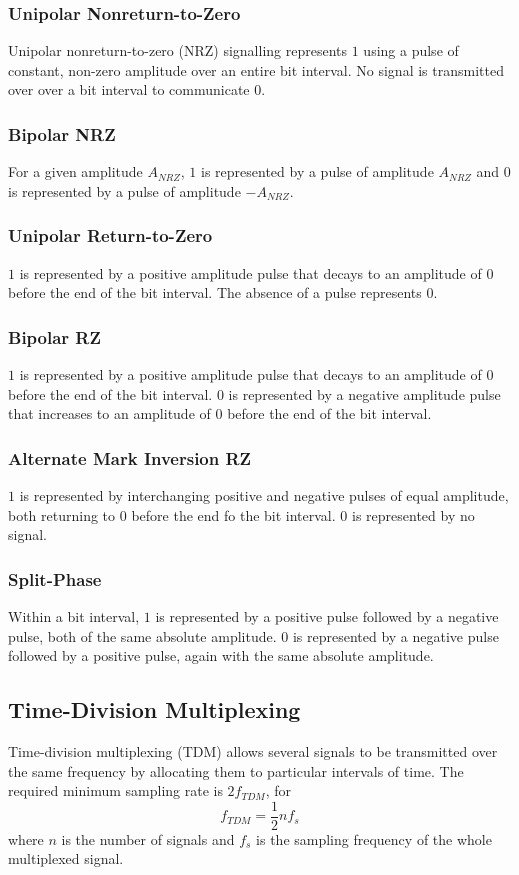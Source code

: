 \documentclass[]{article}
\begin{document}
\subsubsection{Unipolar Nonreturn-to-Zero}
Unipolar nonreturn-to-zero (NRZ) signalling represents $1$ using a pulse of constant, non-zero amplitude over an entire bit interval. No signal is transmitted over over a bit interval to communicate $0$.
\subsubsection{Bipolar NRZ}
For a given amplitude $A_{NRZ}$, $1$ is represented by a pulse of amplitude $A_{NRZ}$ and $0$ is represented by a pulse of amplitude $-A_{NRZ}$.
\subsubsection{Unipolar Return-to-Zero}
$1$ is represented by a positive amplitude pulse that decays to an amplitude of $0$ before the end of the bit interval. The absence of a pulse represents $0$.
\subsubsection{Bipolar RZ}
$1$ is represented by a positive amplitude pulse that decays to an amplitude of $0$ before the end of the bit interval. $0$ is represented by a negative amplitude pulse that increases to an amplitude of $0$ before the end of the bit interval.
\subsubsection{Alternate Mark Inversion RZ}
$1$ is represented by interchanging positive and negative pulses of equal amplitude, both returning to $0$ before the end fo the bit interval. $0$ is represented by no signal.
\subsubsection{Split-Phase}
Within a bit interval, $1$ is represented by a positive pulse followed by a negative pulse, both of the same absolute amplitude. $0$ is represented by a negative pulse followed by a positive pulse, again with the same absolute amplitude.
\subsection{Time-Division Multiplexing}
Time-division multiplexing (TDM) allows several signals to be transmitted over the same frequency by allocating them to particular intervals of time. The required minimum sampling rate is $2f_{TDM}$, for \begin{equation}f_{TDM} = \frac{1}{2}nf_{s}\end{equation}
where $n$ is the number of signals and $f_{s}$ is the sampling frequency of the whole multiplexed signal.
\end{document}
